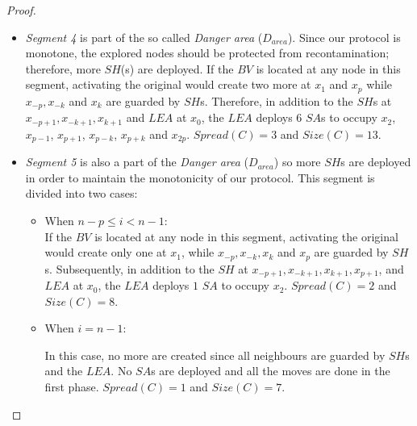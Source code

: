 \begin{proof}
\begin{itemize}
\item {\em Segment 4} is part of the so called {\it Danger area} ($D_{area}$). Since our protocol is monotone, the explored nodes should be protected from recontamination; therefore, more $SH$(s) are deployed.  
If the $BV$ is located at any node in this segment, activating the original \bv would create two more \bvs at $x_{1}$ and $x_{p}$ while $x_{-p},x_{-k}$ and $x_{k}$ are guarded by $SH$s. Therefore, in addition to the $SH$s at $x_{-p+1},x_{-k+1},x_{k+1}$ and $LEA$ at $x_{0}$, the $LEA$ deploys $6$  $SA$s to occupy $x_{2}$, $x_{p-1}$, $x_{p+1}$, $x_{p-k}$, $x_{p+k}$ and $x_{2p}$. $Spread(C)=3$ and $Size(C)=13$.   

\item 
{\em Segment 5} is also a part of the {\it Danger area} ($D_{area}$) so more $SH$s are deployed in order to maintain the monotonicity of our protocol. This segment is divided into two cases:
\begin{itemize}
\item When $n-p\leq i < n-1$:\\ 

If the $BV$ is located at any node in this segment, activating the original \bv would create only one \bv at $x_{1}$, while $x_{-p},x_{-k},x_{k}$ and $x_{p}$ are guarded by $SH$s. Subsequently, in addition to the $SH$ at $x_{-p+1},x_{-k+1},x_{k+1},x_{p+1}$, and $LEA$ at $x_{0}$, the $LEA$ deploys $1$  $SA$ to occupy $x_{2}$. $Spread(C)=2$ and $Size(C)=8$.  \\ 

\item  When $i=n-1$: %
 
In this case, no more \bvs are created since all neighbours are guarded by $SH$s and the $LEA$. No $SA$s are deployed and all the moves are done in the first phase. $Spread(C)=1$ and $Size(C)=7$.  \\ 
\end{itemize}
\end{itemize}

\end{proof}






